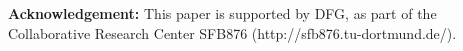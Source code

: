 \documentclass[10pt,conference,preprint]{IEEEtran}
\begin{document}








{\bf Acknowledgement:} This paper is supported by DFG, as part of the Collaborative Research Center SFB876 (http://sfb876.tu-dortmund.de/).

{}
\end{document}
